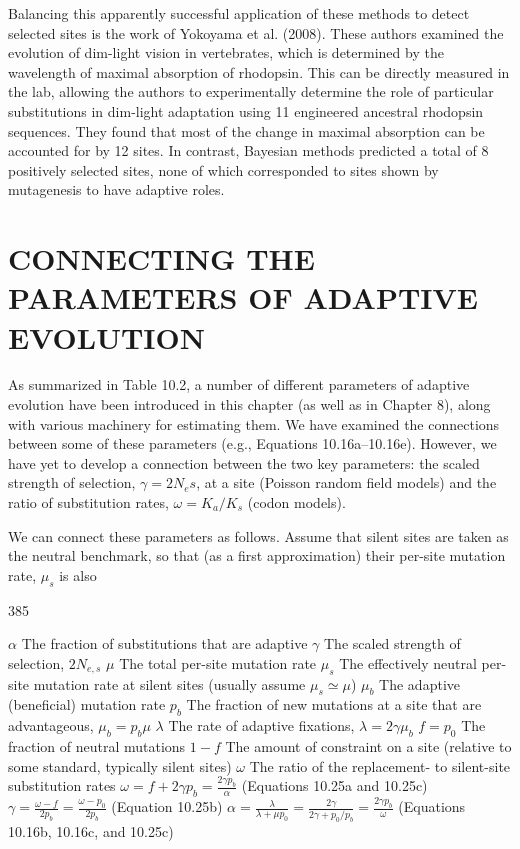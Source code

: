 \documentclass{article}
\begin{document}
Balancing this apparently successful application of these methods to detect selected sites is the work of Yokoyama et al. (2008). These authors examined the evolution of dim-light vision in vertebrates, which is determined by the wavelength of maximal absorption of rhodopsin. This can be directly measured in the lab, allowing the authors to experimentally determine the role of particular substitutions in dim-light adaptation using 11 engineered ancestral rhodopsin sequences. They found that most of the change in maximal absorption can be accounted for by 12 sites. In contrast, Bayesian methods predicted a total of 8 positively selected sites, none of which corresponded to sites shown by mutagenesis to have adaptive roles.

\section{CONNECTING THE PARAMETERS OF ADAPTIVE EVOLUTION}
As summarized in Table 10.2, a number of different parameters of adaptive evolution have been introduced in this chapter (as well as in Chapter 8), along with various machinery for estimating them. We have examined the connections between some of these parameters (e.g., Equations 10.16a–10.16e). However, we have yet to develop a connection between the two key parameters: the scaled strength of selection,  $ \gamma = 2N_e s $, at a site (Poisson random field models) and the ratio of substitution rates,  $ \omega = K_a / K_s $ (codon models).

We can connect these parameters as follows. Assume that silent sites are taken as the neutral benchmark, so that (as a first approximation) their per-site mutation rate,  $ \mu_{s} $ is also

385

 $ \alpha $ The fraction of substitutions that are adaptive
 $ \gamma $ The scaled strength of selection,  $ 2N_{e,s} $
 $ \mu $ The total per-site mutation rate
 $ \mu_{s} $ The effectively neutral per-site mutation rate at silent sites (usually assume  $ \mu_{s} \simeq \mu $)
 $ \mu_{b} $ The adaptive (beneficial) mutation rate
 $ p_{b} $ The fraction of new mutations at a site that are advantageous,  $ \mu_{b} = p_{b}\mu $
 $ \lambda $ The rate of adaptive fixations,  $ \lambda = 2\gamma\mu_{b} $
 $ f = p_{0} $ The fraction of neutral mutations
 $ 1 - f $ The amount of constraint on a site (relative to some standard, typically silent sites)
 $ \omega $ The ratio of the replacement- to silent-site substitution rates
 $ \omega = f + 2\gamma p_{b} = \frac{2\gamma p_{b}}{\alpha} $ (Equations 10.25a and 10.25c)
 $ \gamma = \frac{\omega - f}{2p_{b}} = \frac{\omega - p_{0}}{2p_{b}} $ (Equation 10.25b)
 $ \alpha = \frac{\lambda}{\lambda + \mu p_{0}} = \frac{2\gamma}{2\gamma + p_{0}/p_{b}} = \frac{2\gamma p_{b}}{\omega} $ (Equations 10.16b, 10.16c, and 10.25c)
\end{document}

